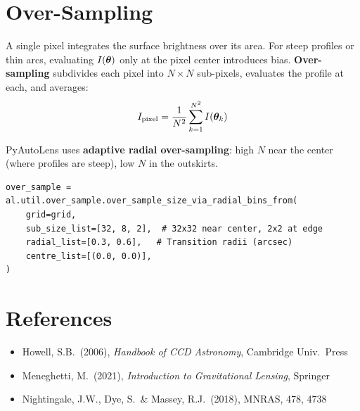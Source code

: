 \documentclass[11pt, letterpaper]{article}
\begin{document}
\section{Over-Sampling}
\label{sec:oversampling}

A single pixel integrates the surface brightness over its area. For
steep profiles or thin arcs, evaluating $I(\bm{\theta})$ only at the pixel
center introduces bias. \textbf{Over-sampling} subdivides each pixel
into $N \times N$ sub-pixels, evaluates the profile at each, and
averages:
\begin{equation}
I_{\rm pixel} = \frac{1}{N^2} \sum_{k=1}^{N^2} I(\bm{\theta}_k)
\label{eq:oversampling}
\end{equation}

PyAutoLens uses \textbf{adaptive radial over-sampling}: high $N$ near
the center (where profiles are steep), low $N$ in the outskirts.

\begin{pythonbox}
\begin{lstlisting}
over_sample = al.util.over_sample.over_sample_size_via_radial_bins_from(
    grid=grid,
    sub_size_list=[32, 8, 2],  # 32x32 near center, 2x2 at edge
    radial_list=[0.3, 0.6],   # Transition radii (arcsec)
    centre_list=[(0.0, 0.0)],
)
\end{lstlisting}
\end{pythonbox}

\section*{References}

\begin{itemize}[nosep, leftmargin=*]
  \item Howell, S.B.\ (2006), \emph{Handbook of CCD Astronomy}, Cambridge Univ.\ Press
  \item Meneghetti, M.\ (2021), \emph{Introduction to Gravitational Lensing}, Springer
  \item Nightingale, J.W., Dye, S.\ \& Massey, R.J.\ (2018), MNRAS, 478, 4738
\end{itemize}
\end{document}
